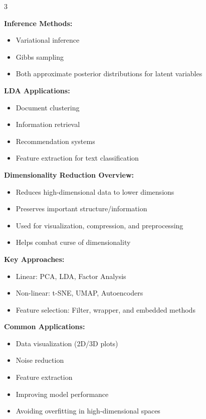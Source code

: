 \documentclass[10pt,landscape]{article}
\begin{document}
\begin{multicols}{3}
\begin{tcolorbox}[breakable, title=6.3 Latent Dirichlet Allocation (LDA), colback=mixture]
\textbf{Inference Methods:}
\begin{itemize}[leftmargin=*,noitemsep,topsep=0pt]
    \item Variational inference
    \item Gibbs sampling
    \item Both approximate posterior distributions for latent variables
\end{itemize}

\textbf{LDA Applications:}
\begin{itemize}[leftmargin=*,noitemsep,topsep=0pt]
    \item Document clustering
    \item Information retrieval
    \item Recommendation systems
    \item Feature extraction for text classification
\end{itemize}
\end{tcolorbox}

\begin{tcolorbox}[breakable, title=7. Dimensionality Reduction Concepts, colback=dimension]
\textbf{Dimensionality Reduction Overview:}
\begin{itemize}[leftmargin=*,noitemsep,topsep=0pt]
    \item Reduces high-dimensional data to lower dimensions
    \item Preserves important structure/information
    \item Used for visualization, compression, and preprocessing
    \item Helps combat curse of dimensionality
\end{itemize}

\textbf{Key Approaches:}
\begin{itemize}[leftmargin=*,noitemsep,topsep=0pt]
    \item Linear: PCA, LDA, Factor Analysis
    \item Non-linear: t-SNE, UMAP, Autoencoders
    \item Feature selection: Filter, wrapper, and embedded methods
\end{itemize}

\textbf{Common Applications:}
\begin{itemize}[leftmargin=*,noitemsep,topsep=0pt]
    \item Data visualization (2D/3D plots)
    \item Noise reduction
    \item Feature extraction
    \item Improving model performance
    \item Avoiding overfitting in high-dimensional spaces
\end{itemize}


\end{tcolorbox}
\end{multicols}
\end{document}
